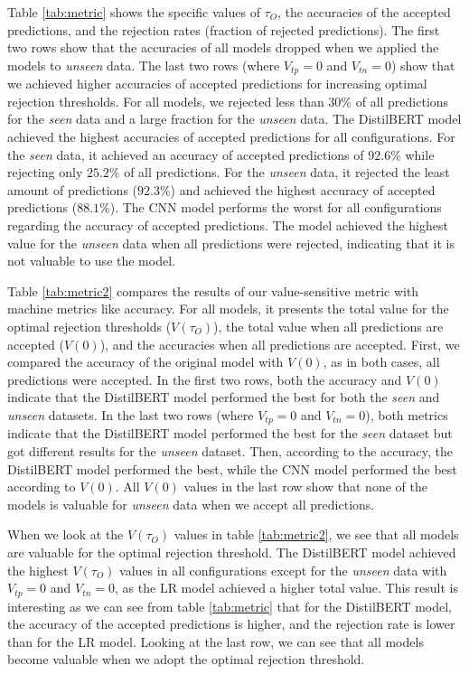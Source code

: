 %
Table \ref{tab:metric} shows the specific values of $\tau_O$, the accuracies of the accepted predictions, and the rejection rates (fraction of rejected predictions).
%
The first two rows show that the accuracies of all models dropped when we applied the models to \emph{unseen} data.
%
The last two rows (where $V_{tp}=0$ and $V_{tn}=0$) show that we achieved higher accuracies of accepted predictions for increasing optimal rejection thresholds.
%
For all models, we rejected less than 30\% of all predictions for the \emph{seen} data and a large fraction for the \emph{unseen} data.
%
The DistilBERT model achieved the highest accuracies of accepted predictions for all configurations.
%
For the \emph{seen} data, it achieved an accuracy of accepted predictions of $92.6\%$ while rejecting only $25.2\%$ of all predictions.
%
For the \emph{unseen} data, it rejected the least amount of predictions ($92.3\%$) and achieved the highest accuracy of accepted predictions ($88.1\%$).
%
The CNN model performs the worst for all configurations regarding the accuracy of accepted predictions.
%
The model achieved the highest value for the \emph{unseen} data when all predictions were rejected, indicating that it is not valuable to use the model.

%
Table \ref{tab:metric2} compares the results of our value-sensitive metric with machine metrics like accuracy.
%
For all models, it presents the total value for the optimal rejection thresholds ($V(\tau_O)$), the total value when all predictions are accepted ($V(0)$), and the accuracies when all predictions are accepted.
%
First, we compared the accuracy of the original model with $V(0)$, as in both cases, all predictions were accepted.
%
In the first two rows, both the accuracy and $V(0)$ indicate that the DistilBERT model performed the best for both the \emph{seen} and \emph{unseen} datasets.
%
In the last two rows (where $V_{tp}=0$ and $V_{tn}=0$), both metrics indicate that the DistilBERT model performed the best for the \emph{seen} dataset but got different results for the \emph{unseen} dataset.
%
Then, according to the accuracy, the DistilBERT model performed the best, while the CNN model performed the best according to $V(0)$.
%
All $V(0)$ values in the last row show that none of the models is valuable for \emph{unseen} data when we accept all predictions.
%

%
When we look at the $V(\tau_O)$ values in table \ref{tab:metric2}, we see that all models are valuable for the optimal rejection threshold.
%
The DistilBERT model achieved the highest $V(\tau_O)$ values in all configurations except for the \emph{unseen} data with $V_{tp}=0$ and $V_{tn}=0$, as the LR model achieved a higher total value.
%
This result is interesting as we can see from table \ref{tab:metric} that for the DistilBERT model, the accuracy of the accepted predictions is higher, and the rejection rate is lower than for the LR model.
%
Looking at the last row, we can see that all models become valuable when we adopt the optimal rejection threshold.


